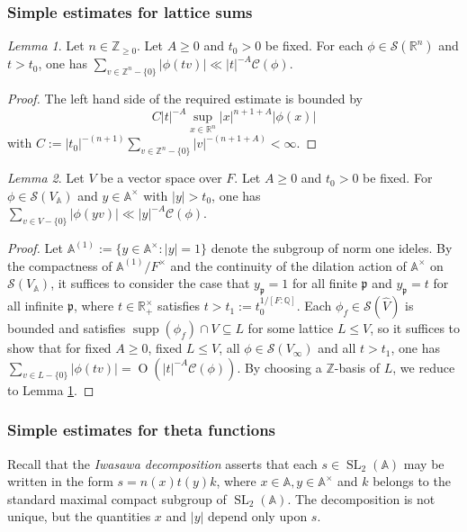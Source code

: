 \documentclass[reqno,10pt]{amsart}
\theoremstyle{plain} %
\theoremstyle{definition}
\theoremstyle{plain} %
\theoremstyle{remark}
\theoremstyle{itplain} %
\newtheorem{lemma}{Lemma}
\theoremstyle{remark} %
\renewcommand{\geq}{\geqslant}
\renewcommand{\leq}{\leqslant}
\numberwithin{equation}{section}
\DeclareMathOperator{\SL}{SL}
\def\O{\operatorname{O}}
\DeclareMathOperator{\supp}{supp}
\begin{document}
\subsubsection{Simple estimates for lattice sums}\label{sec:simple-estimates-for-lattice-sums}
\begin{lemma}\label{lem:cheap-lattice-sum-bound-Rn-Zn}
  Let $n \in \mathbb{Z}_{\geq 0}$.  Let $A \geq 0$ and $t_0 > 0$ be fixed.  For each $\phi \in \mathcal{S}(\mathbb{R}^n)$ and $t > t_0$, one has $\sum_{v \in \mathbb{Z}^n - \{0\}} |\phi(t v)| \ll |t|^{-A} \mathcal{C}(\phi)$.
\end{lemma}
\begin{proof}
  The left hand side of the required estimate %
  is bounded by
  \[C |t|^{-A} \sup_{x \in \mathbb{R}^n} |x|^{n+1+A} |\phi(x)|\] with $C := |t_0|^{-(n+1)} \sum_{v \in \mathbb{Z}^n - \{0\}} |v|^{-(n+1+A)} < \infty$.
\end{proof}
\begin{lemma}\label{lem:cheap-lattice-sum-bound-adelic}
  Let $V$ be a vector space over $F$.  Let $A \geq 0$ and $t_0 > 0$ be fixed.  For $\phi \in \mathcal{S}(V_\mathbb{A})$ and $y \in \mathbb{A}^\times$ with $|y| > t_0$, one has $\sum_{v \in V - \{0\}} |\phi(y v)| \ll |y|^{-A} \mathcal{C}(\phi)$.
\end{lemma}
\begin{proof}
  Let $\mathbb{A}^{(1)} := \{y \in \mathbb{A}^\times : |y| = 1\}$ denote the subgroup of norm one ideles.  By the compactness of $\mathbb{A}^{(1)} / F^\times$ and the continuity of the dilation action of $\mathbb{A}^\times$ on $\mathcal{S}(V_\mathbb{A})$, it suffices to consider the case that $y_\mathfrak{p} = 1$ for all finite $\mathfrak{p}$ and $y_\mathfrak{p} = t$ for all infinite $\mathfrak{p}$, where $t \in \mathbb{R}_+^\times$ satisfies $t > t_1 := t_0^{1/[F:\mathbb{Q}]}$.  Each $\phi_f \in \mathcal{S}(\hat{V})$ is bounded and satisfies $\supp(\phi_f) \cap V \subseteq L$ for some lattice $L \leq V$, so it suffices to show
  that for fixed $A \geq 0$, fixed $L \leq V$, all $\phi \in \mathcal{S}(V_\infty)$ and all $t > t_1$, one has $\sum_{v \in L - \{0\}} |\phi(t v)| = \O(|t|^{-A} \mathcal{C}(\phi))$.  By choosing a $\mathbb{Z}$-basis of $L$, we reduce to Lemma \ref{lem:cheap-lattice-sum-bound-Rn-Zn}.
\end{proof}




\subsubsection{Simple estimates for theta functions}
\label{sec-3-5-4}
Recall that the \emph{Iwasawa decomposition} asserts that each $s \in \SL_2(\mathbb{A})$ may be written in the form $s = n(x) t(y) k$, where $x \in \mathbb{A}, y \in \mathbb{A}^\times$ and $k$ belongs to the standard maximal compact subgroup of $\SL_2(\mathbb{A})$.  The decomposition is not unique, but the quantities $x$ and $|y|$ depend only upon $s$.
\end{document}
